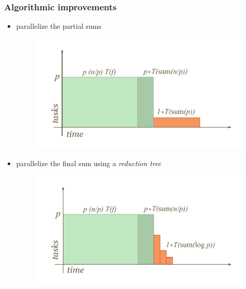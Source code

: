 \begin{frame}[fragile]
%
  \frametitle{Algorithmic improvements}
%
  \begin{itemize}
%
  \item parallelize the partial sums
    \begin{figure}
      \centering
      \includegraphics[scale=0.6]{figures/reduction-partial-sum.pdf}
    \end{figure}
%
  \item parallelize the final sum using a {\em reduction tree}
    \begin{figure}
      \centering
      \includegraphics[scale=0.6]{figures/reduction-tree-sum.pdf}
    \end{figure}
%
  \end{itemize}
%
\end{frame}

